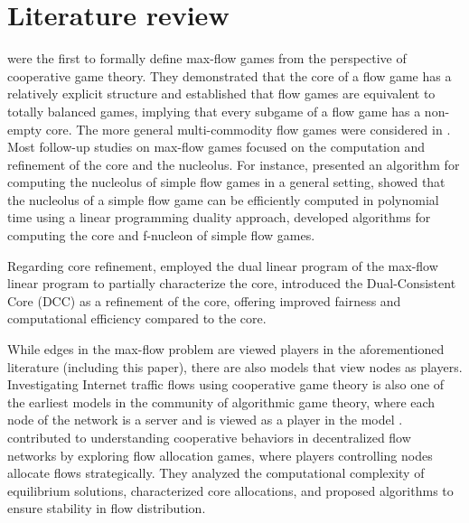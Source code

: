 \section{Literature review}
\cite{1982kalaibalanced,Kalai1982} were the first to formally define max-flow games from the perspective of cooperative game theory. They demonstrated that the core of a flow game has a relatively explicit structure and established that flow games are equivalent to totally balanced games, implying that every subgame of a flow game has a non-empty core. The more general multi-commodity flow games were considered in \cite{derks1985stable}.  Most follow-up studies on max-flow games  focused on the computation and refinement of the core and the nucleolus. For instance, \cite{potters2006nucleolus} presented an algorithm for computing the nucleolus of simple flow games in a general setting, \cite{Deng2009nucleolus} showed that the nucleolus of a simple flow game can be efficiently computed in polynomial time using a linear programming duality approach, \cite{Kern2009morflow} developed algorithms for computing the core and f-nucleon of simple flow games.  

Regarding core refinement, \cite{2023vvv} employed the dual linear program of the max-flow linear program to partially characterize the core,  \cite{vvv2024} introduced the Dual-Consistent Core (DCC) as a refinement of the core,  offering improved fairness and computational efficiency compared to the core.

While edges in the max-flow problem are viewed  players in the aforementioned literature (including this paper), there are also models that view nodes as players.  Investigating Internet traffic flows using  cooperative game theory is also one of the earliest models in the community of algorithmic game theory, where each node of the network is a server and is viewed as a player  in the model \citep{papadimitriou2001algorithms,markakis2003core}. \cite{mor2024} contributed to understanding cooperative behaviors in decentralized flow networks by exploring flow allocation games, where players controlling nodes allocate flows strategically. They analyzed the computational complexity of equilibrium solutions, characterized core allocations, and proposed algorithms to ensure stability in flow distribution. 


